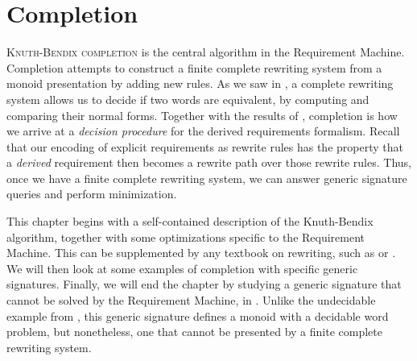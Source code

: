 \documentclass[../generics]{subfiles}
\begin{document}
\chapter{Completion}\label{chap:completion}

%
\lettrine{K}{nuth-Bendix completion} is the central algorithm in the Requirement Machine. Completion attempts to construct a finite complete rewriting system from a monoid presentation by adding new rules. As we saw in , a complete rewriting system allows us to decide if two words are equivalent, by computing and comparing their normal forms. Together with the results of , completion is how we arrive at a \emph{decision procedure} for the derived requirements formalism. Recall that our encoding of explicit requirements as rewrite rules has the property that a \emph{derived} requirement then becomes a rewrite path over those rewrite rules. Thus, once we have a finite complete rewriting system, we can answer generic signature queries and perform minimization.

This chapter begins with a self-contained description of the Knuth-Bendix algorithm, together with some optimizations specific to the Requirement Machine. This can be supplemented by any textbook on rewriting, such as \cite{book2012string} or \cite{andallthat}. We will then look at some examples of completion with specific generic signatures. Finally, we will end the chapter by studying a generic signature that cannot be solved by the Requirement Machine, in . Unlike the undecidable example from , this generic signature defines a monoid with a decidable word problem, but nonetheless, one that cannot be presented by a finite complete rewriting system.
\end{document}
